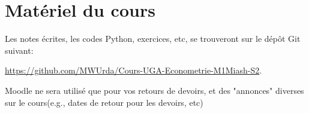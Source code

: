 \section{Matériel du cours}

Les notes écrites, les codes Python, exercices, etc, se trouveront sur le dépôt Git suivant:

\url{https://github.com/MWUrda/Cours-UGA-Econometrie-M1Miash-S2}.

Moodle ne sera utilisé que pour vos retours de devoirs, et des "annonces" diverses sur le cours(e.g., dates de retour pour les devoirs, etc)


 
